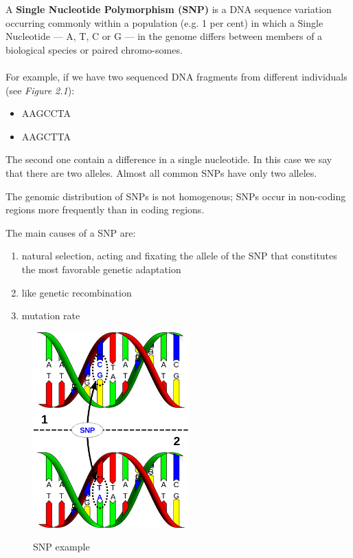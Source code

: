 A \textbf{Single Nucleotide Polymorphism (SNP)} is a DNA sequence variation occurring commonly within a population (e.g. 1 per cent) in which a Single Nucleotide — A, T, C or G — in the genome differs between members of a biological species or paired chromo-somes. 
\\
\\For example, if we have two sequenced DNA fragments from different individuals (see \emph{Figure 2.1}):

\begin{itemize}
	\item AAGCCTA
	\item AAGCTTA
\end{itemize}

The second one contain a difference in a single nucleotide. In this case we say that there are two alleles. Almost all common SNPs have only two alleles. 

The genomic distribution of SNPs is not homogenous; SNPs occur in non-coding regions more frequently than in coding regions.

\newpage

The main causes of a SNP are:

\begin{enumerate}
	\item natural selection, acting and fixating the allele of the SNP that constitutes the most favorable genetic adaptation
	\item like genetic recombination
	\item mutation rate
	\end{enumerate}

\begin{figure}[ht!]
	\centering
	\includegraphics[width=60mm]{../Images/SNP_example.png}
	\label{overflow}
	\caption{SNP example}
	\end{figure}

